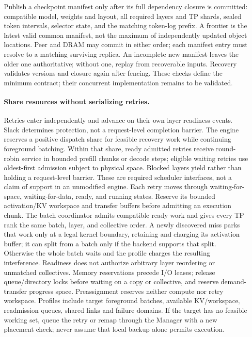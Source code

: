 Publish a checkpoint manifest only after its full dependency closure is
committed: compatible model, weights and layout, all required layers and TP
shards, sealed token intervals, selector state, and the matching token-log
prefix. A frontier is the latest valid common manifest, not the maximum
of independently updated object locations. Peer and DRAM may commit in
either order; each manifest entry must resolve to a matching surviving
replica. An incomplete new manifest leaves the older one authoritative;
without one, replay from recoverable inputs. Recovery validates versions
and closure again after fencing. These checks define the minimum contract;
their concurrent implementation remains to be validated.

\paragraph{Share resources without serializing retries.}
Retries enter independently and advance on their own layer-readiness
events. Slack determines protection, not a request-level completion
barrier. The engine reserves a positive dispatch share for feasible recovery
work while continuing foreground batching. Within that share, ready admitted
retries receive round-robin service in bounded prefill chunks or decode steps;
eligible waiting retries use oldest-first admission subject to physical space.
Blocked layers yield rather than holding a request-level barrier. These are
required scheduler interfaces, not a claim of support in an unmodified engine.
Each retry moves through waiting-for-space, waiting-for-data, ready, and
running states. Reserve its bounded activation/KV workspace and transfer
buffers before admitting an execution chunk. The batch coordinator admits
compatible ready work and gives every TP rank the same batch, layer, and
collective order. A newly discovered miss parks that work only at a legal
kernel boundary, retaining and charging its activation buffer; it can split
from a batch only if the backend supports that split. Otherwise the whole
batch waits and the profile charges the resulting interference. Readiness
does not authorize arbitrary layer reordering or unmatched collectives.
Memory reservations precede I/O leases; release queue/directory locks before
waiting on a copy or collective, and reserve demand-transfer progress space.
Preassignment reserves neither compute nor retry workspace. Profiles
include target foreground batches, available KV/workspace, readmission
queues, shared links and failure domains. If the target has no feasible
working set, queue the retry or remap through the Manager with a new
placement check; never assume that local backup alone permits execution.

